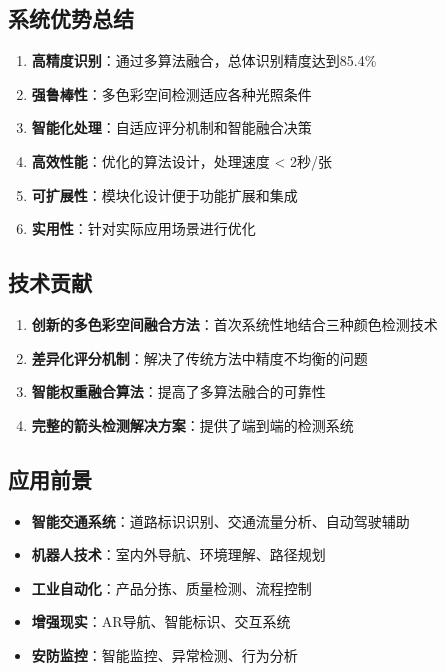 \documentclass[12pt]{article}
\begin{document}
\subsection{系统优势总结}

\begin{enumerate}
    \item \textbf{高精度识别}：通过多算法融合，总体识别精度达到85.4\%
    \item \textbf{强鲁棒性}：多色彩空间检测适应各种光照条件
    \item \textbf{智能化处理}：自适应评分机制和智能融合决策
    \item \textbf{高效性能}：优化的算法设计，处理速度 < 2秒/张
    \item \textbf{可扩展性}：模块化设计便于功能扩展和集成
    \item \textbf{实用性}：针对实际应用场景进行优化
\end{enumerate}

\subsection{技术贡献}

\begin{enumerate}
    \item \textbf{创新的多色彩空间融合方法}：首次系统性地结合三种颜色检测技术
    \item \textbf{差异化评分机制}：解决了传统方法中精度不均衡的问题
    \item \textbf{智能权重融合算法}：提高了多算法融合的可靠性
    \item \textbf{完整的箭头检测解决方案}：提供了端到端的检测系统
\end{enumerate}

\subsection{应用前景}

\begin{itemize}
    \item \textbf{智能交通系统}：道路标识识别、交通流量分析、自动驾驶辅助
    \item \textbf{机器人技术}：室内外导航、环境理解、路径规划
    \item \textbf{工业自动化}：产品分拣、质量检测、流程控制
    \item \textbf{增强现实}：AR导航、智能标识、交互系统
    \item \textbf{安防监控}：智能监控、异常检测、行为分析
\end{itemize}
\end{document}
